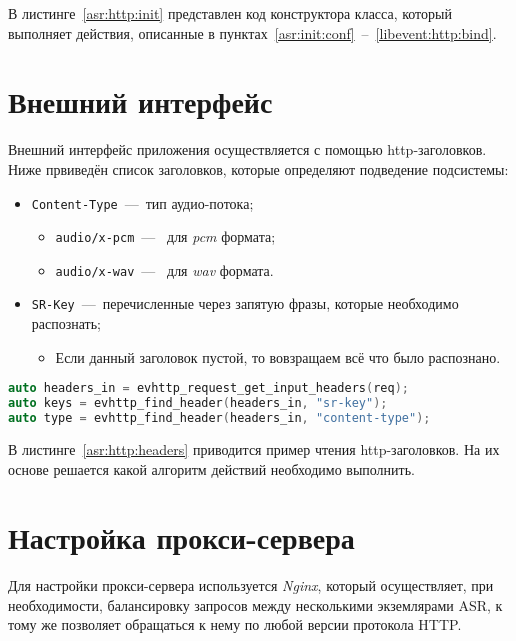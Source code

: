 В листинге~\ref{asr:http:init} представлен код конструктора класса, который
выполняет действия, описанные в пунктах~\ref{asr:init:conf}~--~\ref{libevent:http:bind}.

\section{Внешний интерфейс}

Внешний интерфейс приложения осуществляется с помощью http-заголовков. Ниже
првиведён список заголовков, которые определяют подведение подсистемы:
\begin{itemize}
    \item \texttt{Content-Type}~---~тип аудио-потока;
    \begin{itemize}
        \item\texttt{audio/x-pcm}~---~ для \textit{pcm} формата;
        \item\texttt{audio/x-wav}~---~ для \textit{wav} формата.
    \end{itemize}
    \item \texttt{SR-Key}~---~перечисленные через запятую фразы, которые необходимо распознать;
    \begin{itemize}
        \item Если данный заголовок пустой, то вовзращаем всё что было распознано.
    \end{itemize}
\end{itemize}

\begin{lstlisting}[caption={Чтение заголовков},label={asr:http:headers},language=C++]
auto headers_in = evhttp_request_get_input_headers(req);
auto keys = evhttp_find_header(headers_in, "sr-key");
auto type = evhttp_find_header(headers_in, "content-type");

\end{lstlisting}

В листинге~\ref{asr:http:headers} приводится пример чтения http-заголовков. На их
основе решается какой алгоритм действий необходимо выполнить.

\section{Настройка прокси-сервера}

Для настройки прокси-сервера используется \textit{Nginx}, который осуществляет,
при необходимости, балансировку запросов между несколькими экземлярами ASR, к
тому же позволяет обращаться к нему по любой версии протокола HTTP.

